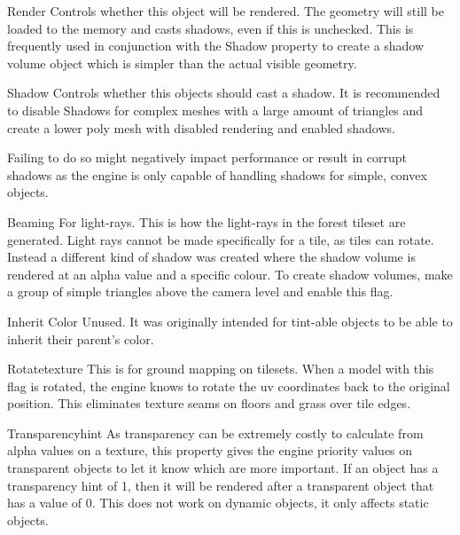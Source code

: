 \begin{propertyAurora}{Render}
Controls whether this object will be rendered. The geometry will still be loaded to the memory and 
casts shadows, even if this is unchecked. This is frequently used in conjunction with the Shadow
property to create a shadow volume object which is simpler than the actual visible geometry.
\end{propertyAurora}

\begin{propertyAurora}{Shadow}
Controls whether this objects should cast a shadow. It is recommended to 
disable Shadows for complex meshes with a large amount of triangles and create 
a lower poly mesh with disabled rendering and enabled shadows.

Failing to do so might negatively impact performance or result in corrupt shadows as 
the engine is only capable of handling shadows for simple, convex objects.
\end{propertyAurora}

\begin{propertyAurora}{Beaming}
For light-rays. This is how the light-rays in the forest tileset are generated. 
Light rays cannot be made specifically for a tile, as tiles can rotate.
Instead a different kind of shadow was created where the shadow
volume is rendered at an alpha value and a specific colour. To create shadow
volumes, make a group of simple triangles above the camera level and enable
this flag.
\end{propertyAurora}

\begin{propertyAurora}{Inherit Color}
Unused. It was originally intended for tint-able objects to be 
able to inherit their parent's color.
\end{propertyAurora}

\begin{propertyAurora}{Rotatetexture}
This is for ground mapping on tilesets. When a model with
this flag is rotated, the engine knows to rotate the uv coordinates back 
to the original position. This eliminates texture seams on floors 
and grass over tile edges.
\end{propertyAurora}

\begin{propertyAurora}{Transparencyhint}
As transparency can be extremely costly to calculate from alpha values on a
texture, this property gives the engine priority values on transparent objects to let it
know which are more important. If an object has a transparency hint of 1, then it
will be rendered after a transparent object that has a value of 0. This does not work 
on dynamic objects, it only affects static objects.
\end{propertyAurora}

